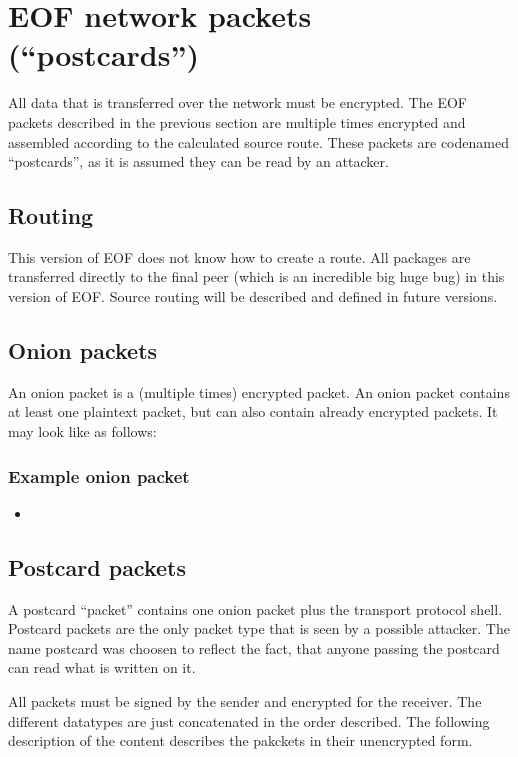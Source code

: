 \documentclass[12pt,a4paper]{book}
\begin{document}
\section{EOF network packets ("`postcards"')}
\label{postcards}
All data that is transferred over the network must be encrypted.
The EOF packets described in the previous section are multiple times
encrypted and assembled according to the calculated source route.
These packets are codenamed "`postcards"', as it is assumed they can be read
by an attacker.
\subsection{Routing}
This version of EOF does not know how to create a route.
All packages are transferred directly to the final peer (which is an
incredible big huge bug) in this version of EOF. Source routing will be
described and defined in future versions.
\subsection{Onion packets}
An onion packet is a (multiple times) encrypted packet.
An onion packet contains at least one plaintext packet, but can also contain
already encrypted packets. It may look like as follows:
\subsubsection{Example onion packet}
\begin{itemize}
\item 
\end{itemize}
\subsection{Postcard packets}
A postcard "`packet"' contains one onion packet plus the transport protocol
shell.  Postcard packets are the only packet type that is seen by a possible
attacker.  The name postcard was choosen to reflect the fact, that anyone
passing the postcard can read what is written on it.

All packets must be signed by the sender and encrypted for the receiver.
The different datatypes are just concatenated in the order described.
The following description of the content describes the pakckets
in their unencrypted form.
\end{document}
